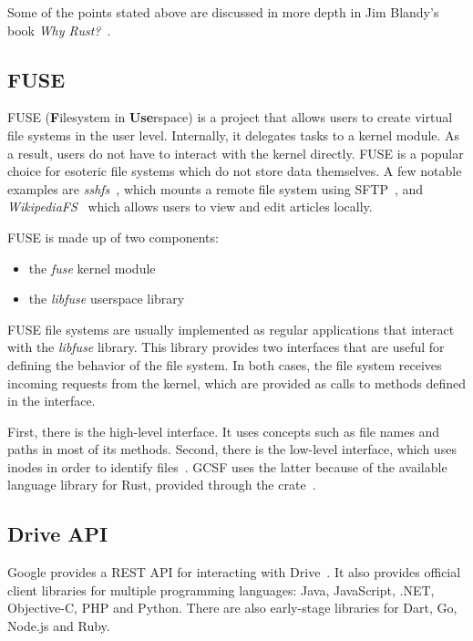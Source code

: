 Some of the points stated above are discussed in more depth in Jim Blandy's book \emph{Why Rust?}~\cite{why_rust}.

\subsection{FUSE}

FUSE (\textbf{F}ilesystem in \textbf{Use}rspace) is a project that allows users to create virtual file systems in the user level. Internally, it delegates tasks to a kernel module. As a result, users do not have to interact with the kernel directly. FUSE is a popular choice for esoteric file systems which do not store data themselves. A few notable examples are \emph{sshfs}~\cite{sshfs}, which mounts a remote file system using SFTP~\cite{sftp}, and \emph{WikipediaFS}~\cite{wikipediafs} which allows users to view and edit articles locally.

FUSE is made up of two components:
\begin{itemize}
  \itemsep0em
  \item the \textit{fuse} kernel module
  \item the \textit{libfuse} userspace library
\end{itemize}

FUSE file systems are usually implemented as regular applications that interact with the \textit{libfuse} library. This library provides two interfaces that are useful for defining the behavior of the file system. In both cases, the file system receives incoming requests from the kernel, which are provided as calls to methods defined in the interface.

First, there is the high-level interface. It uses concepts such as file names and paths in most of its methods. Second, there is the low-level interface, which uses inodes in order to identify files~\cite{tanenbaum}. GCSF uses the latter because of the available language library for Rust, provided through the  crate~\cite{fuse_crate}.

\subsection{Drive API}

Google provides a REST API for interacting with Drive~\cite{google_drive_rest_api_overview}. It also provides official client libraries for multiple programming languages: Java, JavaScript, .NET, Objective-C, PHP and Python. There are also early-stage libraries for Dart, Go, Node.js and Ruby.

